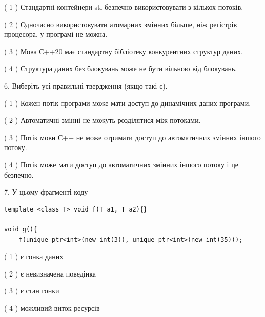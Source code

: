 \documentclass[12pt, ukrainian]{article}
\begin{document}
\begin {large}
{( 1 ) Стандартні контейнери stl безпечно використовувати з кількох потоків.%

( 2 ) Одночасно використовувати атомарних змінних більше, ніж регістрів процесора, у програмі не можна.%

( 3 ) Мова С++20 має стандартну бібліотеку конкурентних структур даних.%

( 4 ) Структура даних без блокувань може не бути вільною від блокувань.%
\newpage



\vspace{5mm}
6. Виберіть усі правильні твердження (якщо такі є).\par
\vspace{2mm}

( 1 ) Кожен потік програми може мати доступ до динамічних даних програми.%

( 2 ) Автоматичні змінні не можуть розділятися між потоками.%

( 3 ) Потік мови С++ не може отримати доступ до автоматичних змінних іншого потоку.%

( 4 ) Потік може мати доступ до автоматичних змінних іншого потоку і це безпечно.%


\vspace{5mm}
7. У цьому фрагменті коду
\begin{verbatim}
template <class T> void f(T a1, T a2){}

void g(){
    f(unique_ptr<int>(new int(3)), unique_ptr<int>(new int(35)));
\end{verbatim}

( 1 ) є гонка даних%

( 2 ) є невизначена поведінка%

( 3 ) є стан гонки%

( 4 ) можливий виток ресурсів%
}
\end {large}
\end{document}
